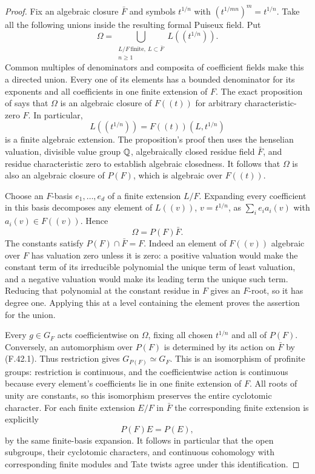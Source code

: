 \begin{proof}
Fix an algebraic closure $\bar F$ and symbols $t^{1/n}$ with
$(t^{1/mn})^m=t^{1/n}$. Take all the following unions inside
the resulting formal Puiseux field. Put
\[
 \Omega=
 \bigcup_{\substack{L/F\ \mathrm{finite},\ L\subset\bar F\\n\ge1}}
                     L((t^{1/n})).
\]
Common multiples of denominators and composita of coefficient
fields make this a directed union. Every one of its elements
has a bounded denominator for its exponents and all coefficients
in one finite extension of $F$. The exact proposition of
\citet[p.~314]{F_vanDenDriesRibenboim1984} says that $\Omega$
is an algebraic closure of $F((t))$ for arbitrary
characteristic-zero $F$. In particular,
\[
 L((t^{1/n}))=F((t))(L,t^{1/n})
\]
is a finite algebraic extension. The proposition's proof then
uses the henselian valuation, divisible value group $\mathbb Q$,
algebraically closed residue field $\bar F$, and residue
characteristic zero to establish algebraic closedness.
It follows that $\Omega$ is also an algebraic closure of
$P(F)$, which is algebraic over $F((t))$.

Choose an $F$-basis $e_1,\ldots,e_d$ of a finite extension
$L/F$. Expanding every coefficient in this basis decomposes
any element of $L((v))$, $v=t^{1/n}$, as
$\sum_i e_i a_i(v)$ with $a_i(v)\in F((v))$. Hence
\[
                         \Omega=P(F)\bar F.                 \tag{F.42.1}
\]
The constants satisfy $P(F)\cap\bar F=F$.
Indeed an element of $F((v))$ algebraic over $F$ has valuation
zero unless it is zero: a positive valuation would make the
constant term of its irreducible polynomial the unique term
of least valuation, and a negative valuation would make its
leading term the unique such term. Reducing that polynomial
at the constant residue in $F$ gives an $F$-root, so it has
degree one. Applying this at a level containing the element
proves the assertion for the union.

Every $g\in G_F$ acts coefficientwise on $\Omega$, fixing all
chosen $t^{1/n}$ and all of $P(F)$. Conversely, an automorphism
over $P(F)$ is determined by its action on $\bar F$ by
(F.42.1). Thus restriction gives $G_{P(F)}\simeq G_F$.
This is an isomorphism of profinite groups: restriction is
continuous, and the coefficientwise action is continuous
because every element's coefficients lie in one finite
extension of $F$. All roots of unity are constants, so this
isomorphism preserves the entire cyclotomic character.
For each finite extension $E/F$ in $\bar F$ the corresponding
finite extension is explicitly
\[
                       P(F)E=P(E),                          \tag{F.42.2}
\]
by the same finite-basis expansion. It follows in particular
that the open subgroups, their cyclotomic characters, and
continuous cohomology with corresponding finite modules
and Tate twists agree under this identification.


\end{proof}
